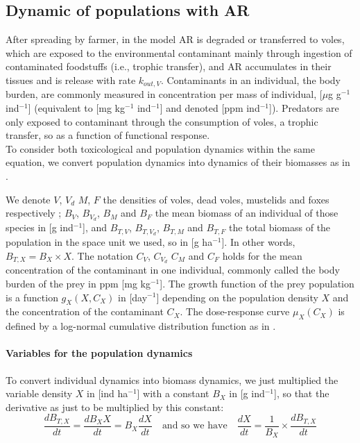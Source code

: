 \documentclass[11pt]{article}
\begin{document}
\subsection{Dynamic of populations with AR}

After spreading by farmer, in the model AR is degraded or transferred to voles, which are exposed to the environmental contaminant mainly through ingestion of contaminated foodstuffs (i.e., trophic transfer), and AR accumulates in their tissues and is release with rate $k_{out,V}$.
%
Contaminants in an individual, the body burden, are commonly measured in concentration per mass of individual, [$\mu$g g$^{-1}$ ind$^{-1}$] (equivalent to [mg kg$^{-1}$ ind$^{-1}$] and denoted [ppm ind$^{-1}$]).
%
Predators are only exposed to contaminant through the consumption of voles, a trophic transfer, so as a function of functional response.
\\


To consider both toxicological and population dynamics within the same equation, we convert population dynamics into dynamics of their biomasses as in \citep{Huang2015EcoTox, Baudrot2018}.

We denote $V$, $V_d$ $M$, $F$ the densities of voles, dead voles, mustelids and foxes respectively ; $B_V$, $B_{V_d}$, $B_M$ and $B_F$ the mean biomass of an individual of those species in [g ind$^{-1}$], and $B_{T,V}$, $B_{T,V_d}$, $B_{T,M}$ and $B_{T,F}$ the total biomass of the population in the space unit we used, so in [g ha$^{-1}$]. In other words, $B_{T,X} = B_X \times X$. The notation $C_V$, $C_{V_d}$ $C_M$ and $C_F$ holds for the mean concentration of the contaminant in one individual, commonly called the body burden of the prey in ppm [mg kg$^{-1}$].
%
The growth function of the prey population is a function $g_X(X, C_X)$ in [day$^{-1}$] depending on the population density $X$ and the concentration of the contaminant $C_X$.
%
The dose-response curve $\mu_X(C_X)$ is defined by a log-normal cumulative distribution function as in \cite{Loos2010}.


\paragraph{Variables for the population dynamics}
%
To convert individual dynamics into biomass dynamics, we just multiplied the variable density $X$ in [ind ha$^{-1}$] with a constant $B_X$ in [g ind$^{-1}$], so that the derivative as just to be multiplied by this constant: 
%
\begin{equation}
\frac{d B_{T,X}}{dt} = \frac{d B_X X}{dt} = B_X \frac{d X}{dt} \quad \text{and so we have} \quad  \frac{d X}{dt} = \frac{1}{B_X} \times \frac{d B_{T,X}}{dt}
\label{eq:biomTOpop}
\end{equation}
%
\end{document}
